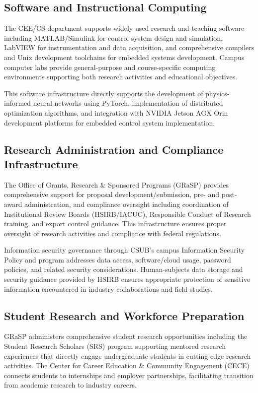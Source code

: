 \documentclass[12pt]{article}
\begin{document}
\subsection{Software and Instructional Computing}

The CEE/CS department supports widely used research and teaching software including MATLAB/Simulink for control system design and simulation, LabVIEW for instrumentation and data acquisition, and comprehensive compilers and Unix development toolchains for embedded systems development. Campus computer labs provide general-purpose and course-specific computing environments supporting both research activities and educational objectives.

This software infrastructure directly supports the development of physics-informed neural networks using PyTorch, implementation of distributed optimization algorithms, and integration with NVIDIA Jetson AGX Orin development platforms for embedded control system implementation.

\subsection{Research Administration and Compliance Infrastructure}

The Office of Grants, Research \& Sponsored Programs (GRaSP) provides comprehensive support for proposal development/submission, pre- and post-award administration, and compliance oversight including coordination of Institutional Review Boards (HSIRB/IACUC), Responsible Conduct of Research training, and export control guidance. This infrastructure ensures proper oversight of research activities and compliance with federal regulations.

Information security governance through CSUB's campus Information Security Policy and program addresses data access, software/cloud usage, password policies, and related security considerations. Human-subjects data storage and security guidance provided by HSIRB ensures appropriate protection of sensitive information encountered in industry collaborations and field studies.

\subsection{Student Research and Workforce Preparation}

GRaSP administers comprehensive student research opportunities including the Student Research Scholars (SRS) program supporting mentored research experiences that directly engage undergraduate students in cutting-edge research activities. The Center for Career Education \& Community Engagement (CECE) connects students to internships and employer partnerships, facilitating transition from academic research to industry careers.
\end{document}
